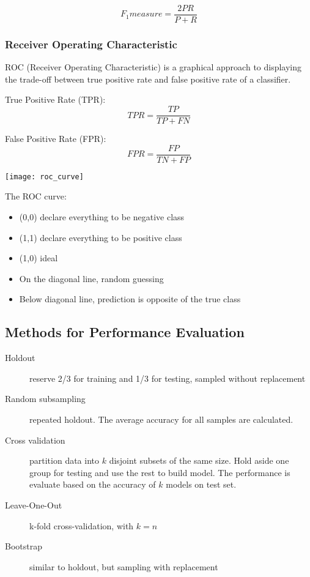 \begin{multicols}{2}
$$F_1measure=\frac{2PR}{P+R}$$

\subsubsection{Receiver Operating Characteristic}

\noindent ROC (Receiver Operating Characteristic) is a graphical approach to displaying the trade-off between true positive rate and false positive rate of a classifier.

\noindent True Positive Rate (TPR):
$$TPR = \frac{TP}{TP+FN}$$

\noindent False Positive Rate (FPR):
$$FPR = \frac{FP}{TN + FP}$$

\begin{center}
\texttt{[image: roc\_curve]}
\end{center}

\noindent The ROC curve:

\begin{itemize}
    \item (0,0) declare everything to be negative class
    \item (1,1) declare everything to be positive class
    \item (1,0) ideal
    \item On the diagonal line, random guessing
    \item Below diagonal line, prediction is opposite of the true class
\end{itemize}

\subsection{Methods for Performance Evaluation}

\begin{description}
    \item[Holdout] reserve 2/3 for training and 1/3 for testing, sampled without replacement
    \item[Random subsampling] repeated holdout. The average accuracy for all samples are calculated. 
    \item[Cross validation] partition data into $k$ disjoint subsets of the same size. Hold aside one group for testing and use the rest to build model. The performance is evaluate based on the accuracy of $k$ models on test set. 
    \item[Leave-One-Out] k-fold cross-validation, with $k=n$
    \item[Bootstrap] similar to holdout, but sampling with replacement
\end{description}

\end{multicols}